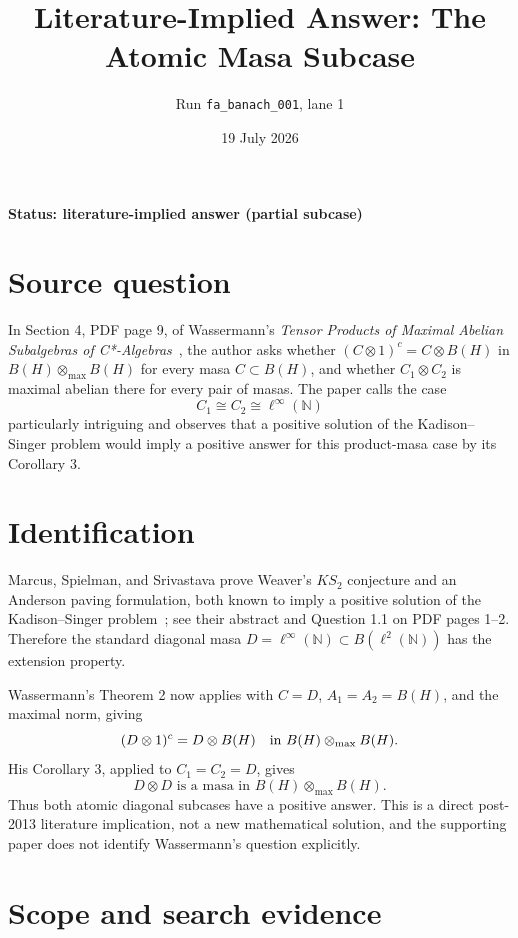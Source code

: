 \documentclass[11pt]{article}
\title{Literature-Implied Answer: The Atomic Masa Subcase}
\author{Run \texttt{fa\_banach\_001}, lane 1}
\date{19 July 2026}
\begin{document}
\maketitle

\begin{center}
\textbf{Status: literature-implied answer (partial subcase)}
\end{center}

\section*{Source question}

In Section 4, PDF page 9, of Wassermann's \emph{Tensor Products of Maximal
Abelian Subalgebras of C*-Algebras}~\cite{W}, the author asks whether
\((C\otimes1)^c=C\otimes B(H)\) in
\(B(H)\otimes_{\max}B(H)\) for every masa \(C\subset B(H)\), and whether
\(C_1\otimes C_2\) is maximal abelian there for every pair of masas.  The
paper calls the case
\[
 C_1\cong C_2\cong\ell^\infty(\mathbb N)
\]
particularly intriguing and observes that a positive solution of the
Kadison--Singer problem would imply a positive answer for this product-masa
case by its Corollary 3.

\section*{Identification}

Marcus, Spielman, and Srivastava prove Weaver's \(KS_2\) conjecture and an
Anderson paving formulation, both known to imply a positive solution of the
Kadison--Singer problem~\cite{MSS}; see their abstract and Question 1.1 on PDF
pages 1--2.  Therefore the standard diagonal masa
\(D=\ell^\infty(\mathbb N)\subset B(\ell^2(\mathbb N))\) has the extension
property.

Wassermann's Theorem 2 now applies with \(C=D\), \(A_1=A_2=B(H)\), and the
maximal norm, giving
\[
 (D\otimes1)^c=D\otimes B(H)
 \quad\hbox{in }B(H)\otimes_{\max}B(H).
\]
His Corollary 3, applied to \(C_1=C_2=D\), gives
\[
 D\otimes D\text{ is a masa in }B(H)\otimes_{\max}B(H).
\]
Thus both atomic diagonal subcases have a positive answer.  This is a direct
post-2013 literature implication, not a new mathematical solution, and the
supporting paper does not identify Wassermann's question explicitly.

\section*{Scope and search evidence}
\end{document}
